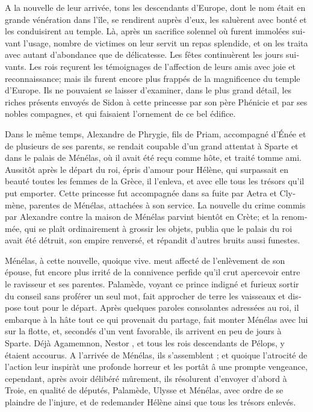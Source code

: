 \documentclass{article}
\begin{document}
\begin{pages}
\begin{Leftside}
\begin{french}
A la nouvelle de leur arrivée, tons les descendants d'Europe, dont le nom était en grande vénération dans l'île, se rendirent auprès d'eux, les saluèrent avec bonté et les conduisirent au temple. Là, après un sacrifice solennel où furent immolées suivant l'usage, nombre de victimes on leur servit un repas splendide, et on les traita avec autant d'abondance que de délicatesse. Les fêtes continuèrent les jours suivants. Les rois reçurent les témoignages de l'affection de leurs amis avec joie et reconnaissance; mais ils furent encore plus frappés de la magnificence du temple d'Europe. Ils ne pouvaient se laisser d'examiner, dans le plus grand détail, les riches présents envoyés de Sidon à cette princesse par son père Phénicie  et par ses nobles compagnes, et qui faisaient l'ornement de ce bel édifice.

Dans le même temps, Alexandre de Phrygie, fils de Priam, accompagné d'Énée  et de plusieurs de ses parents, se rendait coupable d'un grand attentat à Sparte et dans le palais de Ménélas, où il avait été reçu comme hôte, et traité tomme ami. Aussitôt après le départ du roi, épris d'amour pour Hélène, qui surpassait en beauté toutes les femmes de la Grèce, il l'enleva, et avec elle tous les trésors qu'il put emporter. Cette princesse fut accompagnée dans sa fuite par Aetra et Clymène, parentes de Ménélas, attachées à son service. La nouvelle du crime commis par Alexandre contre la maison de Ménélas parvint bientôt en Crète; et la renommée, qui se plaît ordinairement à grossir les objets, publia que le palais du roi avait été détruit, son empire renversé, et répandit d'autres bruits aussi funestes.

Ménélas, à cette nouvelle, quoique vive. meut affecté de l'enlèvement de son épouse, fut encore plus irrité de la connivence perfide qu'il crut apercevoir entre le ravisseur et ses parentes. Palamède, voyant ce prince indigné et furieux sortir du conseil sans proférer un seul mot, fait approcher de terre les vaisseaux et dispose tout pour le départ. Après quelques paroles consolantes adressées au roi, il embarque à la hâte tout ce qui provenait du partage, fait monter Ménélas avec lui sur la flotte, et, secondés d'un vent favorable, ils arrivent en peu de jours à Sparte. Déjà Agamemnon, Nestor , et tous les rois descendants de Pélops, y étaient accourus. A l'arrivée de Ménélas, ils s'assemblent ; et quoique l'atrocité de l'action leur inspiràt une profonde horreur et les portât â une prompte vengeance, cependant, après avoir délibéré mûrement, ils résolurent d'envoyer d'abord à Troie, en qualité de députés, Palamède, Ulysse et Ménélas, avec ordre de se plaindre de l'injure, et de redemander Hélène ainsi que tous les trésors enlevés.


\end{french}
\end{Leftside}
\end{pages}
\end{document}
